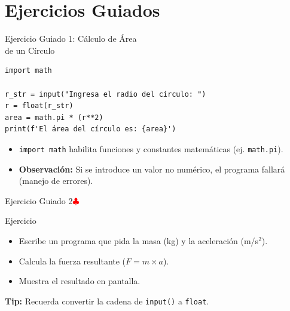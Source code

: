 \documentclass[10pt]{beamer}
\begin{document}
\section{Ejercicios Guiados}


\begin{frame}[fragile]{Ejercicio Guiado 1: Cálculo de Área \\ de un Círculo}
\begin{verbatim}
import math

r_str = input("Ingresa el radio del círculo: ")
r = float(r_str)
area = math.pi * (r**2)
print(f'El área del círculo es: {area}')
\end{verbatim}
\begin{itemize}
  \item \texttt{import math} habilita funciones y constantes matemáticas (ej. \texttt{math.pi}).
  \item \textbf{Observación:} Si se introduce un valor no numérico, el programa fallará (manejo de errores).
\end{itemize}
\end{frame}

\begin{frame}{Ejercicio Guiado 2\hfill \textcolor{red}{$\clubsuit$}}
\begin{block}{Ejercicio}
  \begin{itemize}
    \item Escribe un programa que pida la masa (kg) y la aceleración (m/s\(^2\)).
    \item Calcula la fuerza resultante (\(F = m \times a\)).
    \item Muestra el resultado en pantalla.
  \end{itemize}
\end{block}
\textbf{Tip:} Recuerda convertir la cadena de \texttt{input()} a \texttt{float}.
\end{frame}
\end{document}
